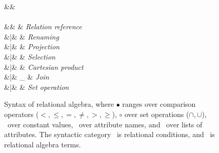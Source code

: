\begin{figure}

\begin{syntax}


\synDef{\pCond}{\pCondSet}
  &\eqq&  \\
\\[1.5ex]

\synDef{\pQ}{\pQSet}
  &\eqq& \pRel                 & \textit{Relation reference} \\
     &|& \pRen[\pRel]{\pQ}     & \textit{Renaming} \\
     &|& \pPrj[\pAttList]{\pQ} & \textit{Projection} \\
     &|& \pSel\pQ              & \textit{Selection} \\
     &|& \pQ \times \pQ & \textit{Cartesian product}\\
     &|& \pQ \Join_{\pCond} \pQ  & \textit{Join} \\
     &|& \pQ \circ \pQ & \textit{Set operation}\\
\end{syntax}

\caption{Syntax of  relational algebra, where $\bullet$ ranges over
comparison operators ($<, \leq, =, \neq, >, \geq$), $\circ$ over 
set operations ($\cap, \cup$), \cte\ over constant values,
\att\ over attribute names, and \pAttList\ over lists of attributes.
The syntactic category
 \pCond\
is relational conditions, and \pQ\ is  relational algebra terms.
}
\label{fig:v-alg-def}
\end{figure}
